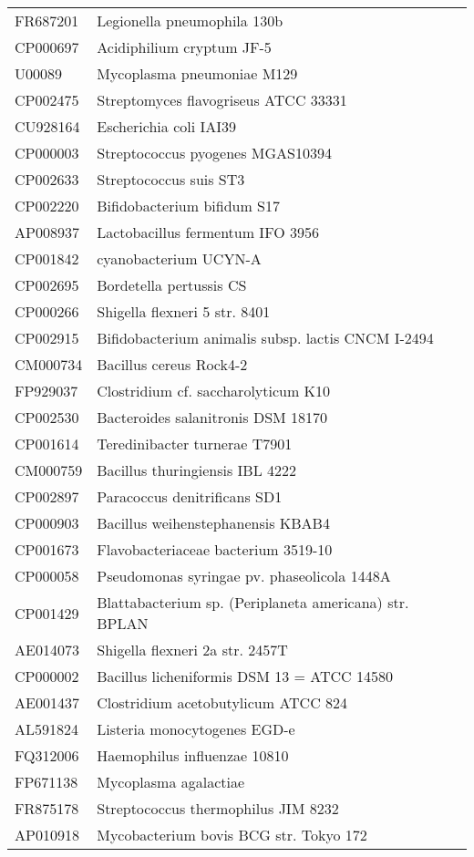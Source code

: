 \begin{longtable}{ll}
FR687201 & Legionella pneumophila 130b\\
CP000697 & Acidiphilium cryptum JF-5\\
U00089 & Mycoplasma pneumoniae M129\\
CP002475 & Streptomyces flavogriseus ATCC 33331\\
CU928164 & Escherichia coli IAI39\\
CP000003 & Streptococcus pyogenes MGAS10394\\
CP002633 & Streptococcus suis ST3\\
CP002220 & Bifidobacterium bifidum S17\\
AP008937 & Lactobacillus fermentum IFO 3956\\
CP001842 & cyanobacterium UCYN-A\\
CP002695 & Bordetella pertussis CS\\
CP000266 & Shigella flexneri 5 str. 8401\\
CP002915 & Bifidobacterium animalis subsp. lactis CNCM I-2494\\
CM000734 & Bacillus cereus Rock4-2\\
FP929037 & Clostridium cf. saccharolyticum K10\\
CP002530 & Bacteroides salanitronis DSM 18170\\
CP001614 & Teredinibacter turnerae T7901\\
CM000759 & Bacillus thuringiensis IBL 4222\\
CP002897 & Paracoccus denitrificans SD1\\
CP000903 & Bacillus weihenstephanensis KBAB4\\
CP001673 & Flavobacteriaceae bacterium 3519-10\\
CP000058 & Pseudomonas syringae pv. phaseolicola 1448A\\
CP001429 & Blattabacterium sp. (Periplaneta americana) str. BPLAN\\
AE014073 & Shigella flexneri 2a str. 2457T\\
CP000002 & Bacillus licheniformis DSM 13 = ATCC 14580\\
AE001437 & Clostridium acetobutylicum ATCC 824\\
AL591824 & Listeria monocytogenes EGD-e\\
FQ312006 & Haemophilus influenzae 10810\\
FP671138 & Mycoplasma agalactiae\\
FR875178 & Streptococcus thermophilus JIM 8232\\
AP010918 & Mycobacterium bovis BCG str. Tokyo 172\\

\end{longtable}
